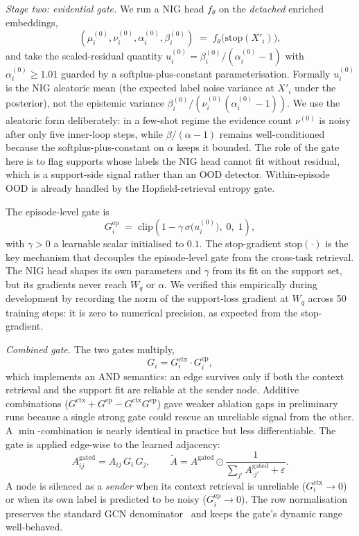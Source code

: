 \documentclass{article}
\theoremstyle{plain}
\theoremstyle{definition}
\theoremstyle{remark}
\begin{document}
\emph{Stage two: evidential gate.} We run a NIG head $f_\theta$ on the \emph{detached} enriched embeddings,
\begin{equation}
    (\mu^{(0)}_i, \nu^{(0)}_i, \alpha^{(0)}_i, \beta^{(0)}_i) \;=\; f_\theta\bigl(\mathrm{stop}(X'_i)\bigr),
\end{equation}
and take the scaled-residual quantity $u^{(0)}_i = \beta^{(0)}_i / (\alpha^{(0)}_i-1)$ with $\alpha^{(0)}_i\ge 1.01$ guarded by a softplus-plus-constant parameterisation. Formally $u^{(0)}_i$ is the NIG aleatoric mean (the expected label noise variance at $X'_i$ under the posterior), not the epistemic variance $\beta^{(0)}_i/(\nu^{(0)}_i(\alpha^{(0)}_i-1))$. We use the aleatoric form deliberately: in a few-shot regime the evidence count $\nu^{(0)}$ is noisy after only five inner-loop steps, while $\beta/(\alpha-1)$ remains well-conditioned because the softplus-plus-constant on $\alpha$ keeps it bounded. The role of the gate here is to flag supports whose labels the NIG head cannot fit without residual, which is a support-side signal rather than an OOD detector. Within-episode OOD is already handled by the Hopfield-retrieval entropy gate.

The episode-level gate is
\begin{equation}
    G^{\text{ep}}_i \;=\; \mathrm{clip}\!\left(1 - \gamma\,\sigma\bigl(u^{(0)}_i\bigr),\; 0,\; 1\right),
\end{equation}
with $\gamma>0$ a learnable scalar initialised to $0.1$. The stop-gradient $\mathrm{stop}(\cdot)$ is the key mechanism that decouples the episode-level gate from the cross-task retrieval. The NIG head shapes its own parameters and $\gamma$ from its fit on the support set, but its gradients never reach $W_q$ or $\alpha$. We verified this empirically during development by recording the norm of the support-loss gradient at $W_q$ across 50 training steps: it is zero to numerical precision, as expected from the stop-gradient.

\emph{Combined gate.} The two gates multiply,
\begin{equation}
    G_i = G^{\text{ctx}}_i \cdot G^{\text{ep}}_i,
\end{equation}
which implements an AND semantics: an edge survives only if both the context retrieval and the support fit are reliable at the sender node. Additive combinations ($G^{\text{ctx}}+G^{\text{ep}}-G^{\text{ctx}}G^{\text{ep}}$) gave weaker ablation gaps in preliminary runs because a single strong gate could rescue an unreliable signal from the other. A $\min$-combination is nearly identical in practice but less differentiable. The gate is applied edge-wise to the learned adjacency:
\begin{equation}
    A^{\text{gated}}_{ij} = A_{ij}\,G_i\,G_j,
    \qquad
    \tilde A = A^{\text{gated}} \odot \frac{1}{\sum_{j'} A^{\text{gated}}_{\cdot j'} + \varepsilon}.
\end{equation}
A node is silenced as a \emph{sender} when its context retrieval is unreliable ($G^{\text{ctx}}_i\to 0$) or when its own label is predicted to be noisy ($G^{\text{ep}}_i\to 0$). The row normalisation preserves the standard GCN denominator~\citep{kipf2017gcn} and keeps the gate's dynamic range well-behaved.
\end{document}
